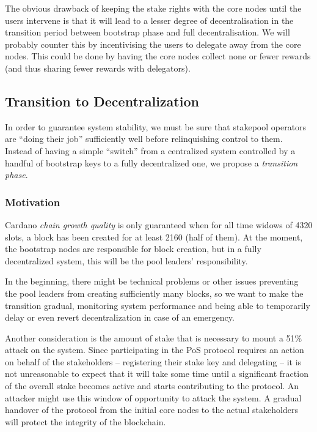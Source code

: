 \documentclass[11pt,a4paper]{article}
\begin{document}
The obvious drawback of keeping the stake rights with the core nodes
until the users intervene is that it will lead to a lesser degree of
decentralisation in the transition period between bootstrap phase and
full decentralisation. We will probably counter this by incentivising
the users to delegate away from the core nodes. This could be done by
having the core nodes collect none or fewer rewards (and thus sharing
fewer rewards with delegators).



\subsection{Transition to
Decentralization}\label{transition-to-decentralization}

In order to guarantee system stability, we must be sure that stakepool
operators are ``doing their job'' sufficiently well before relinquishing
control to them. Instead of having a simple ``switch'' from a
centralized system controlled by a handful of bootstrap keys to a fully
decentralized one, we propose a \emph{transition phase}.

\subsubsection{Motivation}\label{motivation}

Cardano \emph{chain growth quality} is only guaranteed when for all time
widows of 4320 slots, a block has been created for at least 2160 (half
of them). At the moment, the bootstrap nodes are responsible for block
creation, but in a fully decentralized system, this will be the pool
leaders' responsibility.

In the beginning, there might be technical problems or other issues
preventing the pool leaders from creating sufficiently many blocks, so
we want to make the transition gradual, monitoring system performance
and being able to temporarily delay or even revert decentralization in
case of an emergency.

Another consideration is the amount of stake that is necessary to mount
a 51\% attack on the system. Since participating in the PoS protocol
requires an action on behalf of the stakeholders -- registering their
stake key and delegating -- it is not unreasonable to expect that it
will take some time until a significant fraction of the overall stake
becomes active and starts contributing to the protocol. An attacker
might use this window of opportunity to attack the system. A gradual
handover of the protocol from the initial core nodes to the actual
stakeholders will protect the integrity of the blockchain.
\end{document}
